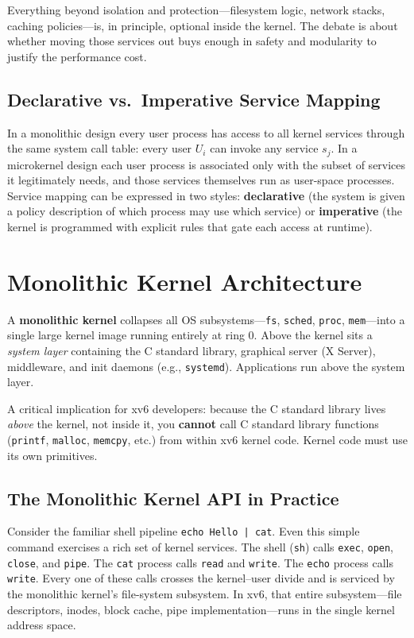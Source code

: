 \documentclass[11pt]{article}
\begin{document}
Everything beyond isolation and protection---filesystem logic, network stacks, caching policies---is, in principle, optional inside the kernel. The debate is about whether moving those services out buys enough in safety and modularity to justify the performance cost.

\subsection{Declarative vs.\ Imperative Service Mapping}

In a monolithic design every user process has access to all kernel services through the same system call table: every user $U_i$ can invoke any service $s_j$. In a microkernel design each user process is associated only with the subset of services it legitimately needs, and those services themselves run as user-space processes. Service mapping can be expressed in two styles: \textbf{declarative} (the system is given a policy description of which process may use which service) or \textbf{imperative} (the kernel is programmed with explicit rules that gate each access at runtime).

\section{Monolithic Kernel Architecture}

A \textbf{monolithic kernel} collapses all OS subsystems---\texttt{fs}, \texttt{sched}, \texttt{proc}, \texttt{mem}---into a single large kernel image running entirely at ring 0. Above the kernel sits a \emph{system layer} containing the C standard library, graphical server (X Server), middleware, and init daemons (e.g., \texttt{systemd}). Applications run above the system layer.

A critical implication for xv6 developers: because the C standard library lives \emph{above} the kernel, not inside it, you \textbf{cannot} call C standard library functions (\texttt{printf}, \texttt{malloc}, \texttt{memcpy}, etc.) from within xv6 kernel code. Kernel code must use its own primitives.

\subsection{The Monolithic Kernel API in Practice}

Consider the familiar shell pipeline \texttt{echo Hello | cat}. Even this simple command exercises a rich set of kernel services. The shell (\texttt{sh}) calls \texttt{exec}, \texttt{open}, \texttt{close}, and \texttt{pipe}. The \texttt{cat} process calls \texttt{read} and \texttt{write}. The \texttt{echo} process calls \texttt{write}. Every one of these calls crosses the kernel--user divide and is serviced by the monolithic kernel's file-system subsystem. In xv6, that entire subsystem---file descriptors, inodes, block cache, pipe implementation---runs in the single kernel address space.
\end{document}

